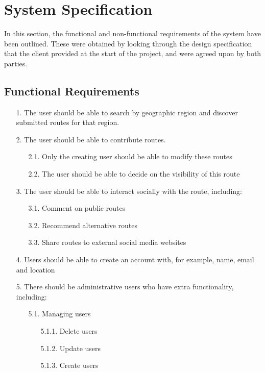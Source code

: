 \section{System Specification}
\label{sec:spec}
In this section, the functional and non-functional requirements of the system have been outlined. These were obtained by looking through the design specification that the client provided at the start of the project, and were agreed upon by both parties. 

\subsection{Functional Requirements}
\label{sec:funcs}

 \begin{enumerate}
 \item[1.] The user should be able to search by geographic region and discover submitted routes for that region.
 \item[2.] The user should be able to contribute routes.
 	\begin{enumerate}
 	\item[2.1.] Only the creating user should be able to modify these routes
 	\item[2.2.] The user should be able to decide on the visibility of this route
 	\end{enumerate}
 \item[3.] The user should be able to interact socially with the route, including:
 	\begin{enumerate}
 	\item[3.1.] Comment on public routes
 	\item[3.2.] Recommend alternative routes
 	\item[3.3.] Share routes to external social media websites
 	\end{enumerate}
 \item[4.] Users should be able to create an account with, for example, name, email and location 
 \item[5.] There should be administrative users who have extra functionality, including:
	 \begin{enumerate}
 		\item[5.1.] Managing users
 		\begin{enumerate}
 			\item[5.1.1.] Delete users
 			\item[5.1.2.] Update users
 			\item[5.1.3.] Create users
 		\end{enumerate}

\end{enumerate}
\end{enumerate}
